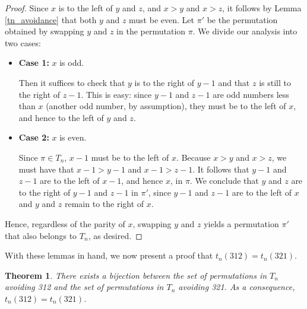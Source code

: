 \documentclass[11pt,letterpaper,twoside,english]{article}
\theoremstyle{theorem}
\newtheorem{theorem}{Theorem}
\theoremstyle{remark}
\begin{document}
\begin{proof}
Since $x$ is to the left of $y$ and $z$, and $x>y$ and $x>z$, it follows by Lemma \ref{tn_avoidance} that both $y$ and $z$ must be even. Let $\pi'$ be the permutation obtained by swapping $y$ and $z$ in the permutation $\pi$. We divide our analysis into two cases:
\begin{itemize}
\item \textbf{Case 1:} $x$ is odd.

Then it suffices to check that $y$ is to the right of $y-1$ and that $z$ is still to the right of $z-1$. This is easy: since $y-1$ and $z-1$ are odd numbers less than $x$ (another odd number, by assumption), they must be to the left of $x$, and hence to the left of $y$ and $z$.

\item \textbf{Case 2:} $x$ is even.

Since $\pi\in T_n$, $x-1$ must be to the left of $x$. Because $x>y$ and $x>z$, we must have that $x-1>y-1$ and $x-1>z-1$. It follows that $y-1$ and $z-1$ are to the left of $x-1$, and hence $x$, in $\pi$. We conclude that $y$ and $z$ are to the right of $y-1$ and $z-1$ in $\pi'$, since $y-1$ and $z-1$ are to the left of $x$ and $y$ and $z$ remain to the right of $x$.
\end{itemize}
Hence, regardless of the parity of $x$, swapping $y$ and $z$ yields a permutation $\pi'$ that also belongs to $T_n$, as desired.
\end{proof}

With these lemmas in hand, we now present a proof that $t_n(312) = t_n(321)$.

\begin{theorem}
There exists a bijection between the set of permutations in $T_n$ avoiding 312 and the set of permutations in $T_n$ avoiding 321. As a consequence, $t_n(312)=t_n(321)$.
\end{theorem}
\end{document}
